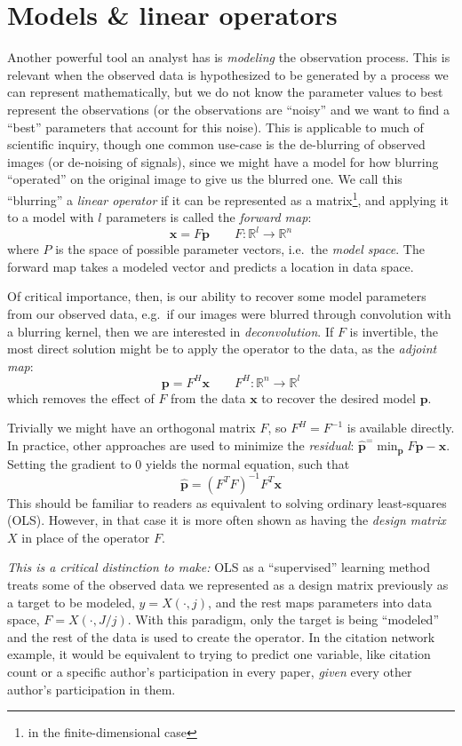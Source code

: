 \documentclass[%
	12pt,
		oneside,
		letterpaper
]{book}
\begin{document}
\section{Models \& linear operators}\label{sec-lin-ops}

Another powerful tool an analyst has is \emph{modeling} the observation
process. This is relevant when the observed data is hypothesized to be
generated by a process we can represent mathematically, but we do not
know the parameter values to best represent the observations (or the
observations are ``noisy'' and we want to find a ``best'' parameters
that account for this noise). This is applicable to much of scientific
inquiry, though one common use-case is the de-blurring of observed
images (or de-noising of signals), since we might have a model for how
blurring ``operated'' on the original image to give us the blurred one.
We call this ``blurring'' a \emph{linear operator} if it can be
represented as a matrix\footnote{in the finite-dimensional case}, and
applying it to a model with \(l\) parameters is called the \emph{forward
map}:
\[\mathbf{x} = F\mathbf{p}\qquad F:\mathbb{R}^{l}\rightarrow \mathbb{R}^n\]
where \(P\) is the space of possible parameter vectors, i.e.~the
\emph{model space}. The forward map takes a modeled vector and predicts
a location in data space.

Of critical importance, then, is our ability to recover some model
parameters from our observed data, e.g.~if our images were blurred
through convolution with a blurring kernel, then we are interested in
\emph{deconvolution}. If \(F\) is invertible, the most direct solution
might be to apply the operator to the data, as the \emph{adjoint map}:
\[ \mathbf{p} = F^H\mathbf{x}\qquad F^H:\mathbb{R}^{n}\rightarrow \mathbb{R}^l\]
which removes the effect of \(F\) from the data \(\mathbf{x}\) to
recover the desired model \(\mathbf{p}\).

Trivially we might have an orthogonal matrix \(F\), so \(F^H=F^{-1}\) is
available directly. In practice, other approaches are used to minimize
the \emph{residual}:
\(\hat{\mathbf{p}}^=\min_{\mathbf{p}} F\mathbf{p}-\mathbf{x}\). Setting
the gradient to 0 yields the normal equation, such that
\[ \hat{\mathbf{p}}=(F^TF)^{-1}F^T\mathbf{x}\] This should be familiar
to readers as equivalent to solving ordinary least-squares (OLS).
However, in that case it is more often shown as having the \emph{design
matrix} \(X\) in place of the operator \(F\).

\emph{This is a critical distinction to make:} OLS as a ``supervised''
learning method treats some of the observed data we represented as a
design matrix previously as a target to be modeled, \(y=X(\cdot,j)\),
and the rest maps parameters into data space, \(F=X(\cdot,J/j)\). With
this paradigm, only the target is being ``modeled'' and the rest of the
data is used to create the operator. In the citation network example, it
would be equivalent to trying to predict one variable, like citation
count or a specific author's participation in every paper, \emph{given}
every other author's participation in them.
\end{document}

